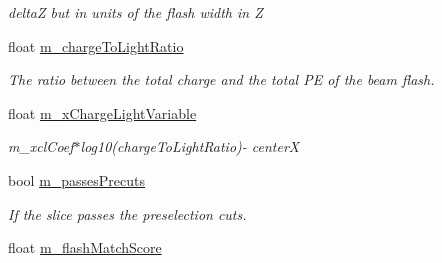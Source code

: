 \begin{DoxyCompactItemize}
\begin{DoxyCompactList}\small\item\em deltaZ but in units of the flash width in Z \end{DoxyCompactList}\item 
float \hyperlink{classflashmatch_1_1FlashMatchingTool_1_1SliceCandidate_a1b4fb1f44be1a50c340b146d41af0a4d}{m\+\_\+charge\+To\+Light\+Ratio}\hypertarget{classflashmatch_1_1FlashMatchingTool_1_1SliceCandidate_a1b4fb1f44be1a50c340b146d41af0a4d}{}\label{classflashmatch_1_1FlashMatchingTool_1_1SliceCandidate_a1b4fb1f44be1a50c340b146d41af0a4d}

\begin{DoxyCompactList}\small\item\em The ratio between the total charge and the total PE of the beam flash. \end{DoxyCompactList}\item 
float \hyperlink{classflashmatch_1_1FlashMatchingTool_1_1SliceCandidate_ad6389ab7c945c5fa2a00798eeff843a5}{m\+\_\+x\+Charge\+Light\+Variable}\hypertarget{classflashmatch_1_1FlashMatchingTool_1_1SliceCandidate_ad6389ab7c945c5fa2a00798eeff843a5}{}\label{classflashmatch_1_1FlashMatchingTool_1_1SliceCandidate_ad6389ab7c945c5fa2a00798eeff843a5}

\begin{DoxyCompactList}\small\item\em m\+\_\+xcl\+Coef$\ast$log10(charge\+To\+Light\+Ratio)-\/ centerX \end{DoxyCompactList}\item 
bool \hyperlink{classflashmatch_1_1FlashMatchingTool_1_1SliceCandidate_a941b9bda87553ae119e5372943be4e8f}{m\+\_\+passes\+Precuts}\hypertarget{classflashmatch_1_1FlashMatchingTool_1_1SliceCandidate_a941b9bda87553ae119e5372943be4e8f}{}\label{classflashmatch_1_1FlashMatchingTool_1_1SliceCandidate_a941b9bda87553ae119e5372943be4e8f}

\begin{DoxyCompactList}\small\item\em If the slice passes the preselection cuts. \end{DoxyCompactList}\item 
float \hyperlink{classflashmatch_1_1FlashMatchingTool_1_1SliceCandidate_ae6023270d1a2728a7cdd24dadd05b006}{m\+\_\+flash\+Match\+Score}\hypertarget{classflashmatch_1_1FlashMatchingTool_1_1SliceCandidate_ae6023270d1a2728a7cdd24dadd05b006}{}\label{classflashmatch_1_1FlashMatchingTool_1_1SliceCandidate_ae6023270d1a2728a7cdd24dadd05b006}


\end{DoxyCompactItemize}
